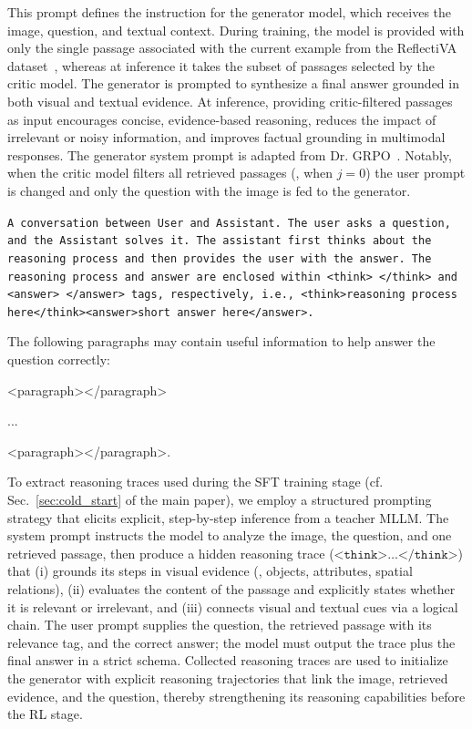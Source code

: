 This prompt defines the instruction for the generator model, which receives the image, question, and textual context. During training, the model is provided with only the single passage associated with the current example from the ReflectiVA dataset~\cite{cocchi2025augmenting}, whereas at inference it takes the subset of passages selected by the critic model. The generator is prompted to synthesize a final answer grounded in both visual and textual evidence. At inference, providing critic-filtered passages as input encourages concise, evidence-based reasoning, reduces the impact of irrelevant or noisy information, and improves factual grounding in multimodal responses. The generator system prompt is adapted from Dr. GRPO~\cite{liu2025understanding}.
Notably, when the critic model filters all retrieved passages (\ie, when $j=0$) the user prompt is changed and only the question with the image is fed to the generator.

\begin{promptbox1}[title={Generator System Prompt}]
\footnotesize
\texttt{A conversation between User and Assistant. The user asks a question, and the Assistant solves it. The assistant first thinks about the reasoning process and then provides the user with the answer. The reasoning process and answer are enclosed within <think> </think> and <answer> </answer> tags, respectively, i.e., <think>reasoning process here</think><answer>short answer here</answer>.}
\end{promptbox1}


\begin{promptbox1}[title={Generator User Prompt}]
\footnotesize
{} 

The following paragraphs may contain useful information to help answer the question correctly:

<paragraph></paragraph>

...

<paragraph></paragraph>.
\end{promptbox1}

To extract reasoning traces used during the SFT training stage (cf. Sec.~\ref{sec:cold_start} of the main paper), we employ a structured prompting strategy that elicits explicit, step-by-step inference from a teacher MLLM. The system prompt instructs the model to analyze the image, the question, and one retrieved passage, then produce a hidden reasoning trace ($\texttt{<think>} \dots \texttt{</think>}$) that (i) grounds its steps in visual evidence (\eg, objects, attributes, spatial relations), (ii) evaluates the content of the passage and explicitly states whether it is relevant or irrelevant, and (iii) connects visual and textual cues via a logical chain. The user prompt supplies the question, the retrieved passage with its relevance tag, and the correct answer; the model must output the trace plus the final answer in a strict schema.
Collected reasoning traces are used to initialize the generator with explicit reasoning trajectories that link the image, retrieved evidence, and the question, thereby strengthening its reasoning capabilities before the RL stage.

